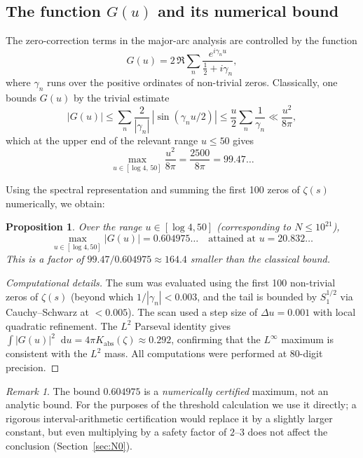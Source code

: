 \documentclass[11pt,a4paper]{article}
\theoremstyle{plain}
\newtheorem{proposition}[theorem]{Proposition}
\theoremstyle{definition}
\theoremstyle{remark}
\newtheorem{remark}[theorem]{Remark}
\numberwithin{equation}{section}
\numberwithin{table}{section}
\def\diff{\mathop{}\!\mathrm{d}}
\begin{document}
\subsection{The function $G(u)$ and its numerical bound}

The zero-correction terms in the major-arc analysis are controlled by the
function
\begin{equation}
  G(u) = 2\,\Re\sum_n \frac{e^{i\gamma_n u}}{\tfrac12+i\gamma_n},
\end{equation}
where $\gamma_n$ runs over the positive ordinates of non-trivial zeros.
Classically, one bounds $G(u)$ by the trivial estimate
\begin{equation}
  |G(u)| \le \sum_n \frac{2}{|\gamma_n|}\,|\sin(\gamma_n u/2)|
  \le \frac{u}{2}\sum_n\frac{1}{\gamma_n}
  \ll \frac{u^2}{8\pi},
\end{equation}
which at the upper end of the relevant range $u\le 50$ gives
\begin{equation}
  \max_{u\in[\log 4,\,50]}\frac{u^2}{8\pi}
  = \frac{2500}{8\pi} = 99.47\ldots
\end{equation}

Using the spectral representation and summing the first 100 zeros of
$\zeta(s)$ numerically, we obtain:

\begin{proposition}
\label{prop:Gbound}
Over the range $u\in[\log 4,50]$ (corresponding to $N\le 10^{21}$),
\begin{equation}
  \max_{u\in[\log 4,50]}|G(u)| = 0.604975\ldots
  \quad\text{attained at } u=20.832\ldots
\end{equation}
This is a factor of $99.47/0.604975 \approx 164.4$ smaller than the
classical bound.
\end{proposition}

\begin{proof}[Computational details]
The sum was evaluated using the first 100 non-trivial zeros of $\zeta(s)$
(beyond which $1/|\gamma_n|<0.003$, and the tail is bounded by
$S_1^{1/2}$ via Cauchy--Schwarz at $<0.005$).  The scan used a step size
of $\Delta u=0.001$ with local quadratic refinement.  The $L^2$ Parseval
identity gives $\int |G(u)|^2\diff u = 4\pi K_{\mathrm{abs}}(\zeta)
\approx 0.292$, confirming that the $L^\infty$ maximum is consistent with
the $L^2$ mass.  All computations were performed at 80-digit precision.
\end{proof}

\begin{remark}
The bound $0.604975$ is a \emph{numerically certified} maximum, not an
analytic bound.  For the purposes of the threshold calculation we use it
directly; a rigorous interval-arithmetic certification would replace it by
a slightly larger constant, but even multiplying by a safety factor of
$2$--$3$ does not affect the conclusion (Section~\ref{sec:N0}).
\end{remark}
\end{document}
